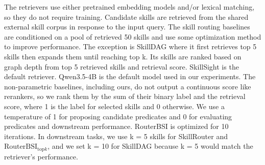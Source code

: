 The retrievers use either pretrained embedding models and/or lexical matching, so they do not require training. Candidate skills are retrieved from the shared external skill corpus in response to the input query. The skill routing baselines are conditioned on a pool of retrieved 50 skills and use some optimization method to improve performance. The exception is SkillDAG where it first retrieves top 5 skills then expands them until reaching top k. Its skills are ranked based on graph depth from top 5 retrieved skills and retrieval score. SkillSight is the default retriever. Qwen3.5-4B is the default model used in our experiments. The non-parametric baselines, including ours, do not output a continuous score like rerankers, so we rank them by the sum of their binary label and the retrieval score, where 1 is the label for selected skills and 0 otherwise. We use a temperature of 1 for proposing candidate predicates and 0 for evaluating predicates and downstream performance. RouterBSI is optimized for 10 iterations. In downstream tasks, we use k = 5 skills for SkillRouter and $\mathrm{RouterBSI}_{\mathrm{top}k}$, and we set k = 10 for SkillDAG because k = 5 would match the retriever's performance.

\afterpage{%
\begingroup
\let\resultstopfigure\figure
\renewcommand{\figure}[1][]{\resultstopfigure[!ht]}

\endgroup
\begingroup
\expandafter\let\expandafter\resultsbottomfigure\csname figure*\endcsname
\expandafter\let\expandafter\endresultsbottomfigure\csname endfigure*\endcsname
\renewenvironment{figure}[1][]{\resultsbottomfigure[!b]}{\endresultsbottomfigure}

\endgroup
}


